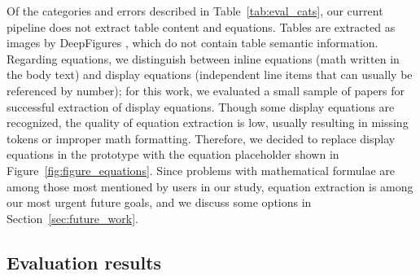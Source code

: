 \begin{table}[t!]
\end{table}

Of the categories and errors described in Table~\ref{tab:eval_cats}, our current pipeline does not extract table content and equations. Tables are extracted as images by DeepFigures \citep{Siegel2018ExtractingSF}, which do not contain table semantic information. Regarding equations, we distinguish between inline equations (math written in the body text) and display equations (independent line items that can usually be referenced by number); for this work, we evaluated a small sample of papers for successful extraction of display equations. Though some display equations are recognized, the quality of equation extraction is low, usually resulting in missing tokens or improper math formatting. Therefore, we decided to replace display equations in the prototype with the equation placeholder shown in Figure~\ref{fig:figure_equations}. Since problems with mathematical formulae are among those most mentioned by users in our study, equation extraction is among our most urgent future goals, and we discuss some options in Section~\ref{sec:future_work}.

\subsection{Evaluation results}
\label{sec:eval_res}

